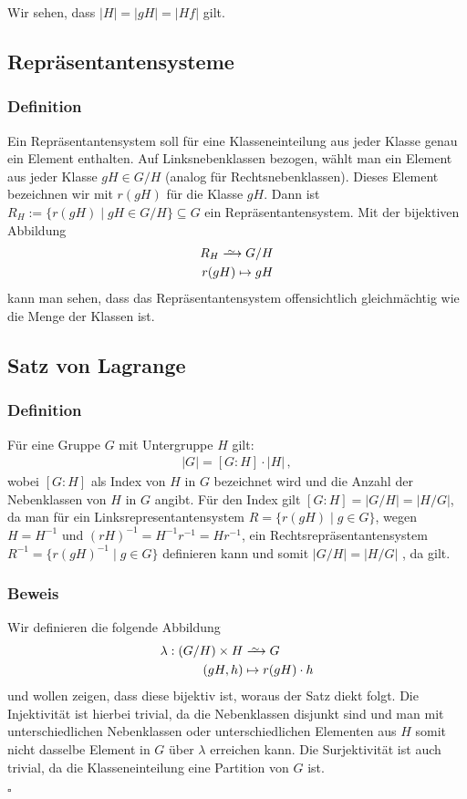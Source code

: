 \documentclass[12pt, german]{article}
\newcommand\iso{\xrightarrow{
		\,\smash{\raisebox{-0.65ex}{\ensuremath{\scriptstyle\sim}}}\,}}
\newcommand{\bewiesen}{
	
	\begin{flushright}
		$\square$  \\
\end{flushright}}
\begin{document}
	Wir sehen, dass $|H|=|gH| = |Hf|$ gilt.
	
	\subsection{Repräsentantensysteme}		
	\subsubsection{Definition}
	Ein Repräsentantensystem soll für eine Klasseneinteilung aus jeder Klasse genau ein Element enthalten.
	Auf Linksnebenklassen bezogen, wählt man ein Element aus jeder Klasse $gH \in G/H$ (analog für Rechtsnebenklassen).
	Dieses Element bezeichnen wir mit $r(gH)$ für die Klasse $gH$. 
	Dann ist $R_H := \{r(gH) \mid gH \in G/H\} \subseteq G$ ein Repräsentantensystem.
	Mit der bijektiven  Abbildung
	\begin{align*}
		R_H \iso G/H \\
		r(gH) \mapsto gH 
	\end{align*}
	kann man sehen, dass das Repräsentantensystem offensichtlich gleichmächtig wie die Menge der Klassen ist.
	\subsection{Satz von Lagrange}	
	\subsubsection{Definition}
	Für eine Gruppe $G$ mit Untergruppe $H$ gilt:
	\begin{align*}
		|G| = [G:H] \cdot |H|\, ,
	\end{align*}	
	wobei $[G:H]$ als Index von $H$ in $G$ bezeichnet wird und die Anzahl der Nebenklassen von $H$ in $G$ angibt. Für den Index gilt $[G:H] = |G/H| = |H/G|$, da man für ein Linksrepresentantensystem $R = \{r(gH) \mid g \in G \}$, wegen $H=H^{-1}$ und $(rH)^{-1} = H^{-1}r^{-1} = Hr^{-1}$, ein Rechtsrepräsentantensystem
	 $R^{-1} = \{r(gH)^{-1} \mid g \in G \}$ definieren kann und somit $|G/H| = |H/G|$ , da gilt.
	
	\subsubsection{Beweis}
	Wir definieren die folgende Abbildung
	\begin{align*}
		\lambda: (G/H) \times H &\iso G \\
		(gH, h) &\mapsto r(gH) \cdot h
	\end{align*}
	und wollen zeigen, dass diese bijektiv ist, woraus der Satz diekt folgt.
	Die Injektivität ist hierbei trivial, da die Nebenklassen disjunkt sind und man mit unterschiedlichen Nebenklassen oder unterschiedlichen Elementen aus $H$ somit nicht dasselbe Element in $G$ über $\lambda$ erreichen kann. Die Surjektivität ist auch trivial, da die Klasseneinteilung eine Partition von $G$ ist.
	\bewiesen	
	
\end{document}
